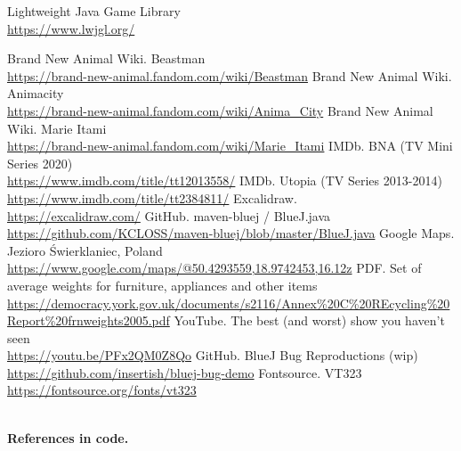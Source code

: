 \documentclass{article}
\begin{document}
    \begin{thebibliography}{9}
        Lightweight Java Game Library \\
        \url{https://www.lwjgl.org/}


        Brand New Animal Wiki. Beastman \\
        \url{https://brand-new-animal.fandom.com/wiki/Beastman}
        Brand New Animal Wiki. Animacity \\
        \url{https://brand-new-animal.fandom.com/wiki/Anima_City}
        Brand New Animal Wiki. Marie Itami \\
        \url{https://brand-new-animal.fandom.com/wiki/Marie_Itami}
        IMDb. BNA (TV Mini Series 2020) \\
        \url{https://www.imdb.com/title/tt12013558/}
        IMDb. Utopia (TV Series 2013-2014) \\
        \url{https://www.imdb.com/title/tt2384811/}
        Excalidraw. \\
        \url{https://excalidraw.com/}
        GitHub. maven-bluej / BlueJ.java \\
        \url{https://github.com/KCLOSS/maven-bluej/blob/master/BlueJ.java}
        Google Maps. Jezioro Świerklaniec, Poland \\
        \url{https://www.google.com/maps/@50.4293559,18.9742453,16.12z}
        PDF. Set of average weights for furniture, appliances and other items \url{https://democracy.york.gov.uk/documents/s2116/Annex\%20C\%20REcycling\%20Report\%20frnweights2005.pdf}
        YouTube. The best (and worst) show you haven't seen \\ \url{https://youtu.be/PFx2QM0Z8Qo}
        GitHub. BlueJ Bug Reproductions (wip) \\ \url{https://github.com/insertish/bluej-bug-demo}
        Fontsource. VT323 \\ \url{https://fontsource.org/fonts/vt323}

        \textbf{\\ References in code.}


\end{thebibliography}
\end{document}
